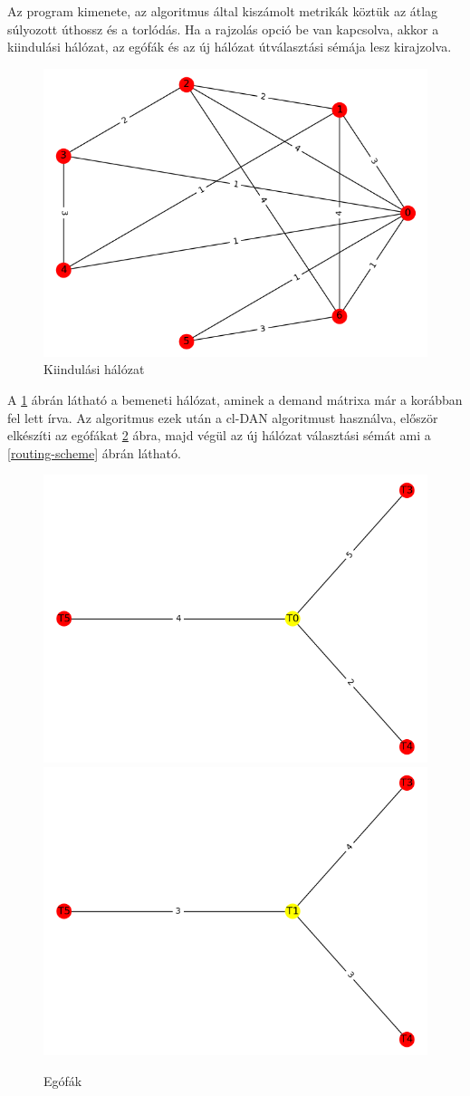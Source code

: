 \documentclass[12pt]{report}
\begin{document}
Az program kimenete, az algoritmus által kiszámolt metrikák köztük az átlag súlyozott úthossz és a torlódás. 
Ha a rajzolás opció be van kapcsolva, akkor a kiindulási hálózat, az egófák és az új hálózat 
útválasztási sémája lesz kirajzolva.

\begin{figure}[H]
	\begin{center}
		\includegraphics[width=0.49\linewidth]{pictures/starting_network.png}
		\caption{Kiindulási hálózat}
		\label{starting-network}
	\end{center}
\end{figure}

A \ref{starting-network} ábrán látható a bemeneti hálózat, aminek a demand mátrixa már a korábban fel lett írva. Az algoritmus ezek után a cl-DAN algoritmust használva, először elkészíti az egófákat \ref{ego-trees} ábra, majd végül az új hálózat választási sémát ami a \ref{routing-scheme} ábrán látható.

\begin{figure}[H]
	\begin{center}
		\includegraphics[width=0.40\linewidth]{pictures/egotree1.png}
		\includegraphics[width=0.40\linewidth]{pictures/egotree2.png}
		\caption{Egófák}
		\label{ego-trees}
	\end{center}
\end{figure}
\end{document}
